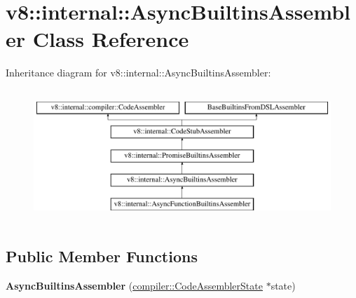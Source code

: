 \hypertarget{classv8_1_1internal_1_1AsyncBuiltinsAssembler}{}\section{v8\+:\+:internal\+:\+:Async\+Builtins\+Assembler Class Reference}
\label{classv8_1_1internal_1_1AsyncBuiltinsAssembler}
Inheritance diagram for v8\+:\+:internal\+:\+:Async\+Builtins\+Assembler\+:\begin{figure}[H]
\begin{center}
\leavevmode
\includegraphics[height=5.000000cm]{classv8_1_1internal_1_1AsyncBuiltinsAssembler}
\end{center}
\end{figure}
\subsection*{Public Member Functions}
\begin{DoxyCompactItemize}
\item 
\mbox{\label{classv8_1_1internal_1_1AsyncBuiltinsAssembler_ab8276574bce55f1182f6980338fdf4ac}} 
{\bfseries Async\+Builtins\+Assembler} (\mbox{\hyperlink{classv8_1_1internal_1_1compiler_1_1CodeAssemblerState}{compiler\+::\+Code\+Assembler\+State}} $\ast$state)
\end{DoxyCompactItemize}
